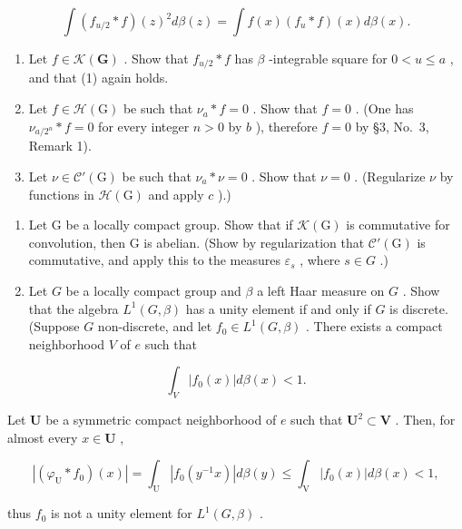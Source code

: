 \[
\int \left(f _ {u / 2} * f\right) (z) ^ {2} d \beta (z) = \int f (x) \left(f _ {u} * f\right) (x) d \beta (x).\tag{1}
\]

\begin{enumerate}
\def\labelenumi{\alph{enumi})}
\setcounter{enumi}{1}
\item
  Let \(f \in \mathcal{K}(\mathbf{G})\) . Show that \(f_{u/2} * f\) has \(\beta\) -integrable square for \(0 < u \leqslant a\) , and that (1) again holds.
\item
  Let \(f \in \mathcal{H}(\mathrm{G})\) be such that \(\nu_{a} * f = 0\) . Show that \(f = 0\) . (One has \(\nu_{a/2^n} * f = 0\) for every integer \(n > 0\) by \(b\) ), therefore \(f = 0\) by §3, No.~3, Remark 1).
\item
  Let \(\nu \in \mathcal{C}'(\mathrm{G})\) be such that \(\nu_{a} * \nu = 0\) . Show that \(\nu = 0\) . (Regularize \(\nu\) by functions in \(\mathcal{H}(\mathrm{G})\) and apply \(c\) ).)
\end{enumerate}

\begin{enumerate}
\def\labelenumi{\arabic{enumi})}
\setcounter{enumi}{5}
\item
  Let G be a locally compact group. Show that if \(\mathcal{K}(\mathrm{G})\) is commutative for convolution, then G is abelian. (Show by regularization that \(\mathcal{C}'(\mathrm{G})\) is commutative, and apply this to the measures \(\varepsilon_{s}\) , where \(s \in G\) .)
\item
  Let \(G\) be a locally compact group and \(\beta\) a left Haar measure on \(G\) . Show that the algebra \(L^1(G, \beta)\) has a unity element if and only if \(G\) is discrete. (Suppose \(G\) non-discrete, and let \(f_0 \in L^1(G, \beta)\) . There exists a compact neighborhood \(V\) of \(e\) such that
\end{enumerate}

\[
\int_ {V} | f _ {0} (x) | d \beta (x) <   1.
\]

Let \(\mathbf{U}\) be a symmetric compact neighborhood of \(e\) such that \(\mathbf{U}^2 \subset \mathbf{V}\) . Then, for almost every \(x \in \mathbf{U}\) ,

\[
\left| \left(\varphi_ {\mathrm{U}} * f _ {0}\right) (x) \right| = \int_ {\mathrm{U}} \left| f _ {0} \left(y ^ {- 1} x\right) \right| d \beta (y) \leqslant \int_ {\mathrm{V}} \left| f _ {0} (x) \right| d \beta (x) <   1,
\]

thus \(f_0\) is not a unity element for \(L^1(G, \beta)\) .

